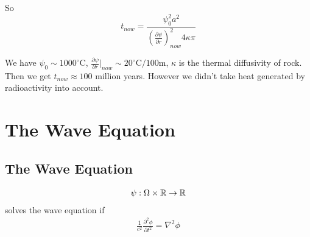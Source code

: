 \documentclass[a4paper]{article}
\begin{document}
So $$t_{now} = \frac{\psi_0^2 a^2}{\left(\frac{\partial \psi}{\partial r}\right)_{now}^2 4\kappa \pi}$$

We have $\psi_0 \sim 1000 ^\circ$C, $\frac{\partial \psi}{\partial r}|_{now} \sim 20^\circ$C$/100$m, $\kappa$ is the thermal diffusivity of rock. Then we get $t_{now} \approx 100$ million years. However we didn't take heat generated by radioactivity into account.

\newpage

\section{The Wave Equation}

\subsection{The Wave Equation}
\begin{equation*}
\begin{aligned}
\psi: \Omega \times \mathbb{R} \to \mathbb{R}
\end{aligned}
\end{equation*}
solves the wave equation if 
\begin{equation*}
\begin{aligned}
\frac{1}{c^2}\frac{\partial^2 \phi}{\partial t^2} = \nabla^2 \phi
\end{aligned}
\end{equation*}
\end{document}
